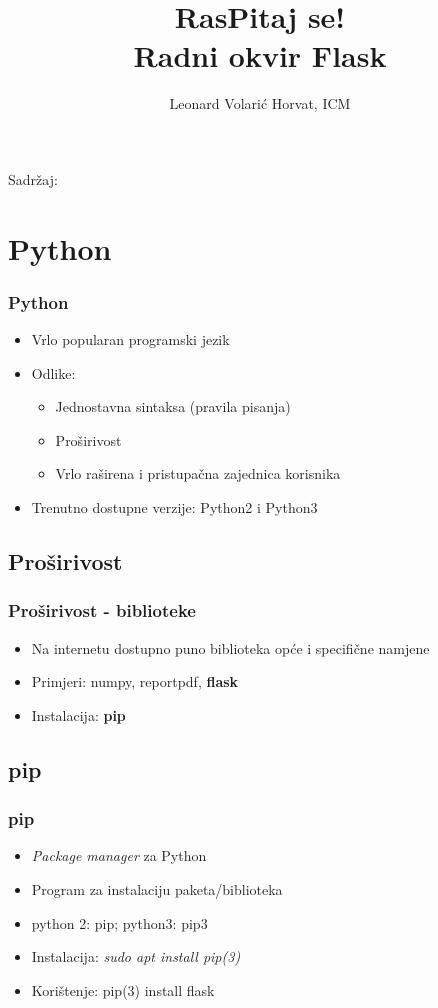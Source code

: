 \documentclass[12pt]{beamer}
\date{}
\title[]{RasPitaj se!\\Radni okvir Flask}
\author[Leonard Volarić Horvat, ICM]{Leonard Volarić Horvat, ICM}
\institute[FER]{Sveučilište u Zagrebu\\Fakultet elektrotehnike i računarstva}
\begin{document}
{
	\begin{frame}
		\maketitle
	\end{frame}
}

\begin{frame}
	Sadržaj:
	\tableofcontents
\end{frame}

\section{Python}
\begin{frame}
\frametitle{Python}
	\begin{itemize}
		\item Vrlo popularan programski jezik
		\item Odlike:
		\begin{itemize}
			\item Jednostavna sintaksa (pravila pisanja)
			\item Proširivost
			\item Vrlo raširena i pristupačna zajednica korisnika
		\end{itemize}
		\item Trenutno dostupne verzije: Python2 i Python3
	\end{itemize}
\end{frame}

\subsection{Proširivost}
\begin{frame}
	\frametitle{Proširivost - biblioteke}
	\begin{itemize}
		\item Na internetu dostupno puno biblioteka opće i specifične namjene
		\item Primjeri: numpy, reportpdf, \textbf{flask}
		\item Instalacija: \textbf{pip}
	\end{itemize}
\end{frame}

\subsection{pip}
\begin{frame}
	\frametitle{pip}
	\begin{itemize}
		\item \textit{Package manager} za Python
		\item Program za instalaciju paketa/biblioteka
		\item python 2: pip; python3: pip3
		\item Instalacija: \textit{sudo apt install pip(3)}
		\item Korištenje: pip(3) install flask
	\end{itemize}
\end{frame}
\end{document}
